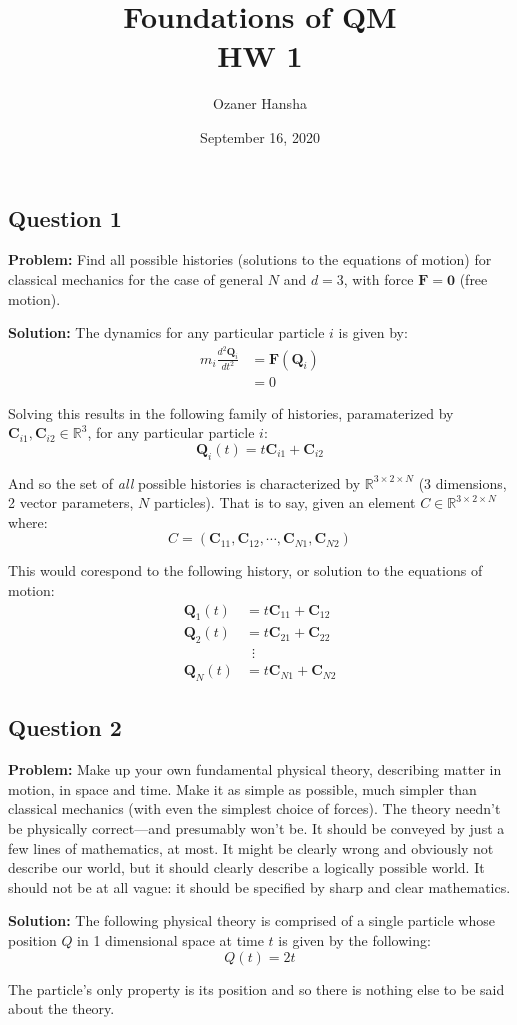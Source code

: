 \documentclass{article}
\renewcommand{\vec}[1]{\mathbf{#1}}
\begin{document}
\title{Foundations of QM\\ HW 1}
\author{Ozaner Hansha}
\date{September 16, 2020}
\maketitle

\subsection*{Question 1}
\noindent\textbf{Problem:} Find all possible histories (solutions to the equations of motion) for classical mechanics for the case of general $N$ and $d=3$, with force $\vec{F}=\vec{0}$ (free motion).
\bigskip

\noindent\textbf{Solution:} The dynamics for any particular particle $i$ is given by:
\begin{align*}
    m_i\frac{d^2\vec{Q}_i}{dt^2}&=\vec{F}(\vec{Q}_i)\tag{Newton's Law}\\
    &=0\tag{free motion}
\end{align*}

Solving this results in the following family of histories, paramaterized by $\vec{C}_{i1},\vec{C}_{i2}\in\mathbb{R}^3$, for any particular particle $i$:
$$\vec{Q}_i(t)=t\vec{C}_{i1}+\vec{C}_{i2}$$

And so the set of \textit{all} possible histories is characterized by $\mathbb{R}^{3\times2\times N}$ (3 dimensions, 2 vector parameters, $N$ particles). That is to say, given an element $C\in \mathbb{R}^{3\times2\times N}$ where:
$$C=(\vec{C}_{11},\vec{C}_{12},\cdots,\vec{C}_{N1},\vec{C}_{N2})$$

This would corespond to the following history, or solution to the equations of motion:
\begin{align*}
    \vec{Q}_1(t)&=t\vec{C}_{11}+\vec{C}_{12}\\
    \vec{Q}_2(t)&=t\vec{C}_{21}+\vec{C}_{22}\\
    &\,\,\,\vdots\\
    \vec{Q}_N(t)&=t\vec{C}_{N1}+\vec{C}_{N2}
\end{align*} 

\subsection*{Question 2}
\noindent\textbf{Problem:} Make up your own fundamental physical theory, describing matter in motion, in space and time. Make it as simple as possible, much simpler than classical mechanics (with even the simplest choice of forces). The theory needn’t be physically correct—and presumably won’t be. It should be conveyed by just a few lines of mathematics, at most. It might be clearly wrong and obviously not describe our world, but it should clearly describe a logically possible world. It should not be at all vague: it should be specified by sharp and clear mathematics.
\bigskip

\noindent\textbf{Solution:} The following physical theory is comprised of a single particle whose position $Q$ in 1 dimensional space at time $t$ is given by the following:
$$Q(t)=2t$$

The particle's only property is its position and so there is nothing else to be said about the theory.
\end{document}
